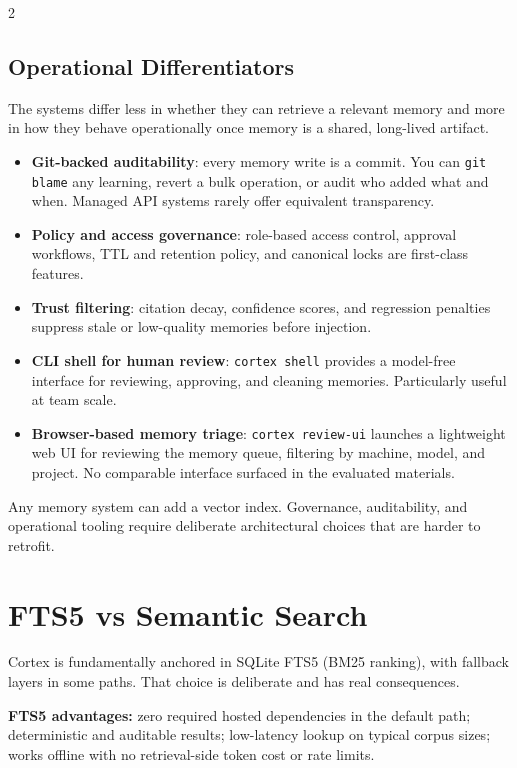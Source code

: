 \documentclass[10pt]{article}
\begin{document}
\begin{multicols}{2}

\subsection{Operational Differentiators}

The systems differ less in whether they can retrieve a relevant memory and more in how they behave operationally once memory is a shared, long-lived artifact.

\begin{itemize}
  \item \textbf{Git-backed auditability}: every memory write is a commit. You can \texttt{git blame} any learning, revert a bulk operation, or audit who added what and when. Managed API systems rarely offer equivalent transparency.
  \item \textbf{Policy and access governance}: role-based access control, approval workflows, TTL and retention policy, and canonical locks are first-class features.
  \item \textbf{Trust filtering}: citation decay, confidence scores, and regression penalties suppress stale or low-quality memories before injection.
  \item \textbf{CLI shell for human review}: \texttt{cortex shell} provides a model-free interface for reviewing, approving, and cleaning memories. Particularly useful at team scale.
  \item \textbf{Browser-based memory triage}: \texttt{cortex review-ui} launches a lightweight web UI for reviewing the memory queue, filtering by machine, model, and project. No comparable interface surfaced in the evaluated materials.
\end{itemize}

Any memory system can add a vector index. Governance, auditability, and operational tooling require deliberate architectural choices that are harder to retrofit.

\section{FTS5 vs Semantic Search}
\label{sec:fts5}

Cortex is fundamentally anchored in SQLite FTS5 (BM25 ranking), with fallback layers in some paths. That choice is deliberate and has real consequences.

\textbf{FTS5 advantages:} zero required hosted dependencies in the default path; deterministic and auditable results; low-latency lookup on typical corpus sizes; works offline with no retrieval-side token cost or rate limits.


\end{multicols}
\end{document}
